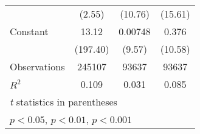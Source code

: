 {\begin{tabular}{l*{3}{c}}
                    &      (2.55)         &     (10.76)         &     (15.61)         \\
[1em]
Constant            &       13.12\sym{***}&     0.00748\sym{***}&       0.376\sym{***}\\
                    &    (197.40)         &      (9.57)         &     (10.58)         \\
\hline
Observations        &      245107         &       93637         &       93637         \\
\(R^{2}\)           &       0.109         &       0.031         &       0.085         \\
\hline\hline
\multicolumn{4}{l}{\footnotesize \textit{t} statistics in parentheses}\\
\multicolumn{4}{l}{\footnotesize \sym{*} \(p<0.05\), \sym{**} \(p<0.01\), \sym{***} \(p<0.001\)}\\
\end{tabular}
}
